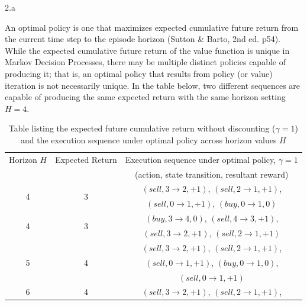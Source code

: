 \LARGE
2.a
\normalsize

\begin{answer}
  An optimal policy is one that maximizes expected cumulative future return from the current time step 
  to the episode horizon (Sutton \& Barto, 2nd ed. p54).  While the expected cumulative future return of 
  the value function is unique in Markov Decision Processes, there may be multiple distinct policies capable 
  of producing it; that is, an optimal policy that results from policy (or value) iteration is not necessarily 
  unique.  In the table below, two different sequences are capable of producing the same expected return with 
  the same horizon setting $H = 4$.

  \begin{table}[h!]
    \begin{center}
    \caption{Table listing the expected future cumulative return without discounting ($\gamma = 1$) and the execution sequence under optimal policy across horizon values $H$}
    \begin{tabular}{c|c|c}
      Horizon $H$  & Expected Return & Execution sequence under optimal policy, $\gamma = 1$      \\
                  &                 & (action, state transition, resultant reward) \\
      \hline
      \multirow{2}{*}{4} & \multirow{2}{*}{3} & $(sell, 3 \rightarrow 2, +1)$, $(sell, 2 \rightarrow 1, +1)$, \\
                             & & $(sell, 0 \rightarrow 1, +1)$, $(buy, 0 \rightarrow 1, 0)$ \\
      \hline
      \multirow{2}{*}{4} & \multirow{2}{*}{3} & $(buy, 3 \rightarrow 4, 0)$, $(sell, 4 \rightarrow 3, +1)$, \\
                              & & $(sell, 3 \rightarrow 2, +1)$, $(sell, 2 \rightarrow 1, +1)$ \\
      \hline
      \multirow{3}{*}{5} & \multirow{3}{*}{4} & $(sell, 3 \rightarrow 2, +1)$, $(sell, 2 \rightarrow 1, +1)$, \\
                              & & $(sell, 0 \rightarrow 1, +1)$, $(buy, 0 \rightarrow 1, 0)$, \\
                              & & $(sell, 0 \rightarrow 1, +1)$ \\
      \hline
  	  \multirow{3}{*}{6} & \multirow{3}{*}{4} & $(sell, 3 \rightarrow 2, +1)$, $(sell, 2 \rightarrow 1, +1)$, \\

\end{tabular}
\end{center}
\end{table}
\end{answer}
